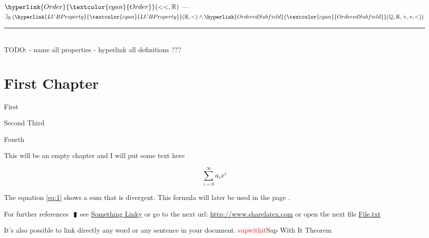\documentclass{book}
\newcommand{\df}[1]{\hypertarget{#1}{\textcolor{red}{#1}}}
\newcommand{\wff}[1]{\hypertarget{#1}{\fbox{\textcolor{red}{#1}}\phantom{--}}}
\newcommand{\rf}[1]{\hyperlink{#1}{\textcolor{cyan}{#1}}}
\newcommand{\pipe}{$\phantom{(}\vrectangleblack\phantom{)}$}
\newcommand{\pr}[1]{\left(#1\right)}
\begin{document}
\wff{OrderR} $\rf{Order}(<<, \mathbb{R})$    \phantom{TODO}--- \\




\wff{ExistenceOfR} $\exists_{\mathbb{R}}\pr{\rf{LUBProperty}(\mathbb{R}, <) \land \rf{OrderedSubfield}(\mathbb{Q}, \mathbb{R}, +, *, <)}$
\begin{enumerate}
\end{enumerate} \vspace{.75mm} \hrule \vspace{.75mm} \ \\








TODO:
- name all properties
- hyperlink all definitions ???
\chapter{First Chapter}

\begin{enumerate}
  \lit First
  \begin{enumerate}
    \lit Second
    \lit Third
  \end{enumerate}
  \lit Fourth
\end{enumerate}


This will be an empty chapter and I will put some text here

\begin{equation}
\label{eq:1}
\sum_{i=0}^{\infty} a_i x^i
\end{equation}

The equation \ref{eq:1} shows a sum that is divergent. This formula 
will later be used in the page \pageref{second}.

For further references \pipe see \href{http://www.sharelatex.com}{Something 
Linky} or go to the next url: \url{http://www.sharelatex.com} or open 
the next file \href{run:./file.txt}{File.txt}

It's also possible to link directly any word or 
\hypertarget{thesentence}{any sentence} in your document.
\df{supwithit}{Sup With It Theorem}
\end{document}
